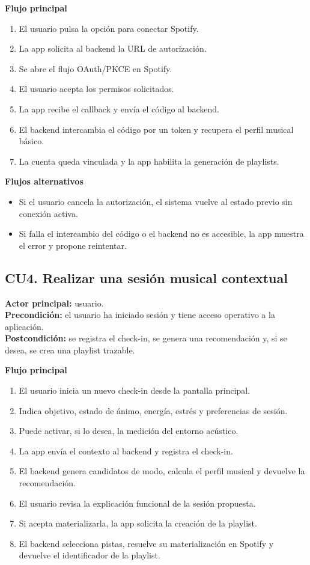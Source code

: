 \textbf{Flujo principal}
\begin{enumerate}[label=\arabic*.]
    \item El usuario pulsa la opción para conectar Spotify.
    \item La app solicita al backend la URL de autorización.
    \item Se abre el flujo OAuth/PKCE en Spotify.
    \item El usuario acepta los permisos solicitados.
    \item La app recibe el callback y envía el código al backend.
    \item El backend intercambia el código por un token y recupera el perfil musical básico.
    \item La cuenta queda vinculada y la app habilita la generación de playlists.
\end{enumerate}

\textbf{Flujos alternativos}
\begin{itemize}
    \item Si el usuario cancela la autorización, el sistema vuelve al estado previo sin conexión activa.
    \item Si falla el intercambio del código o el backend no es accesible, la app muestra el error y propone reintentar.
\end{itemize}

\subsection{CU4. Realizar una sesión musical contextual}

\textbf{Actor principal:} usuario. \\
\textbf{Precondición:} el usuario ha iniciado sesión y tiene acceso operativo a
la aplicación. \\
\textbf{Postcondición:} se registra el check-in, se genera una recomendación y,
si se desea, se crea una playlist trazable.

\textbf{Flujo principal}
\begin{enumerate}[label=\arabic*.]
    \item El usuario inicia un nuevo check-in desde la pantalla principal.
    \item Indica objetivo, estado de ánimo, energía, estrés y preferencias de sesión.
    \item Puede activar, si lo desea, la medición del entorno acústico.
    \item La app envía el contexto al backend y registra el check-in.
    \item El backend genera candidatos de modo, calcula el perfil musical y devuelve la recomendación.
    \item El usuario revisa la explicación funcional de la sesión propuesta.
    \item Si acepta materializarla, la app solicita la creación de la playlist.
    \item El backend selecciona pistas, resuelve su materialización en Spotify y devuelve el identificador de la playlist.
\end{enumerate}

